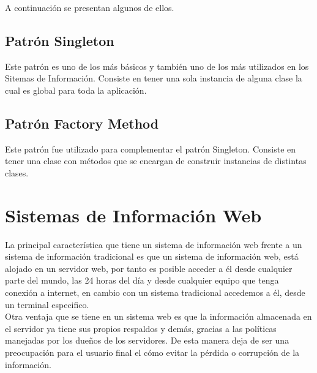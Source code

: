 A continuaci\'on se presentan algunos de ellos.

\subsection{Patr\'on Singleton}
Este patr\'on es uno de los m\'as b\'asicos y tambi\'en uno de los m\'as utilizados en los Sitemas de Informaci\'on. Consiste en tener una sola instancia de alguna clase la cual es global para toda la aplicaci\'on.

\subsection{Patr\'on Factory Method}
Este patr\'on fue utilizado para complementar el patr\'on Singleton. Consiste en tener una clase con m\'etodos que se encargan de construir instancias de distintas clases.

\section{Sistemas de Informaci\'on Web}
La principal caracter\'istica que tiene un sistema de informaci\'on web frente a un sistema de informaci\'on tradicional es que un sistema de informaci\'on web, est\'a alojado en un servidor web, por tanto es posible acceder a \'el desde cualquier parte del mundo, las 24 horas del d\'ia y desde cualquier equipo que tenga conexi\'on a internet, en cambio con un sistema tradicional accedemos a \'el, desde un terminal especifico.\\
Otra ventaja que se tiene en un sistema web es que la informaci\'on almacenada en el servidor ya tiene sus propios respaldos y dem\'as, gracias a las pol\'iticas manejadas por los due\~nos de  los servidores. De esta manera deja de ser una preocupaci\'on para el usuario final el c\'omo evitar la p\'erdida o corrupci\'on de la informaci\'on.

\clearpage
